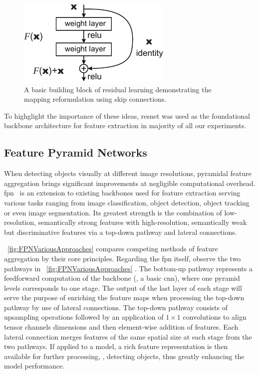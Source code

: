 \begin{figure}[t]
    \centerline{\includegraphics[width=0.35\linewidth]{figures/theoretical_foundations/skip_connections.pdf}}
    \caption[Skip connections]{A basic building block of residual learning demonstrating the mapping reformulation using skip connections. }
    \label{fig:SkipConnections}
\end{figure}

To highglight the importance of these ideas, \Gls{resnet} was used as the foundational backbone architecture for feature extraction in majority of all our experiments.

\subsection{Feature Pyramid Networks}
\label{ssec:FeaturePyramidNetworks}

When detecting objects visually at different image resolutions, pyramidal feature aggregation brings significant improvements at negligible computational overhead. \Gls{fpn}~\cite{lin2017fpn} is an extension to existing backbones used for feature extraction serving various tasks ranging from image classification, object detection, object tracking or even image segmentation. Its greatest strength is the combination of low-resolution, semantically strong features with high-resolution, semantically weak but discriminative features via a top-down pathway and lateral connections.

\figtext{}~\ref{fig:FPNVariousApproaches} compares competing methods of feature aggregation by their core principles. Regarding the \gls{fpn} itself, observe the two pathways in \figtext{}~\ref{fig:FPNVariousApproaches} . The bottom-up pathway represents a feedforward computation of the backbone (\egtext{}, a basic \gls{cnn}), where one pyramid levels corresponds to one stage. The output of the last layer of each stage will serve the purpose of enriching the feature maps when processing the top-down pathway by use of lateral connections. The top-down pathway consists of upsampling operations followed by an application of $1 \times 1$ convolutions to align tensor channels dimensions and then element-wise addition of features. Each lateral connection merges features of the same spatial size at each stage from the two pathways. If applied to a model, a rich feature representation is then available for further processing, \egtext{}, detecting objects, thus greatly enhancing the model performance.

